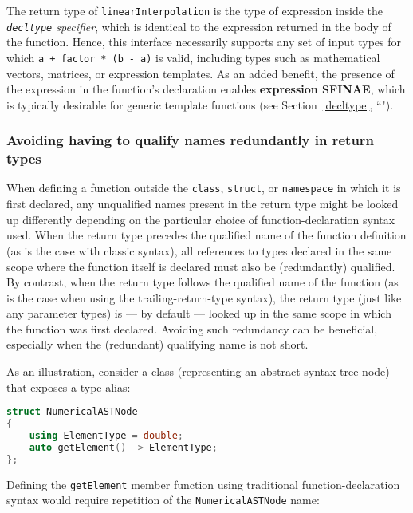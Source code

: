 \noindent The return type of \texttt{linearInterpolation} is the type of
expression inside the \emph{\texttt{decltype} specifier}, which is
identical to the expression returned in the body of the function. Hence,
this interface necessarily supports any set of input types for which
\texttt{a}~\texttt{+}~\texttt{factor}~\texttt{*}~\texttt{(b}~\texttt{-}~\texttt{a)}
is valid, including types such as mathematical vectors, matrices, or
expression templates. As an added benefit, the presence of the
expression in the function's declaration enables \textbf{expression
SFINAE}, which is typically desirable for generic template functions
(see Section~\ref{decltype}, ``").

\subsubsection[Avoiding having to qualify names redundantly in return types]{Avoiding having to qualify names redundantly in return types}\label{avoiding-having-to-qualify-names-redundantly-in-return-types}

When defining a function outside the \texttt{class}, \texttt{struct}, or
\texttt{namespace} in which it is first declared, any unqualified names
present in the return type might be looked up differently depending on
the particular choice of function-declaration syntax used. When the
return type precedes the qualified name of the function definition (as
is the case with classic syntax), all references to types declared in
the same scope where the function itself is declared must also be
(redundantly) qualified. By contrast, when the return type follows the
qualified name of the function (as is the case when using the
trailing-return-type syntax), the return type (just like any parameter
types) is --- by default --- looked up in the same scope in which the
function was first declared. Avoiding such redundancy can be beneficial, especially when the (redundant) qualifying name is not short.

As an illustration, consider a class (representing an abstract syntax
tree node) that exposes a type alias:

\begin{lstlisting}[language=C++]
struct NumericalASTNode
{
    using ElementType = double;
    auto getElement() -> ElementType;
};
\end{lstlisting}
    
\noindent Defining the \texttt{getElement} member function using traditional
function-declaration syntax would require repetition of the
\texttt{NumericalASTNode} name:

